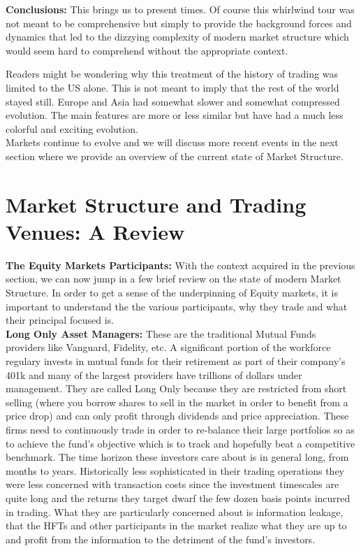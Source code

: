 \noindent\textbf{Conclusions:} This brings us to present times. Of course this whirlwind tour was not meant to be comprehensive but simply to provide the background forces and dynamics that led to the dizzying complexity of modern market structure which would seem hard to comprehend without the appropriate context. 

Readers might be wondering why this treatment of the history of trading was limited to the US alone. This is not meant to imply that the rest of the world stayed still. Europe and Asia had somewhat slower and somewhat compressed evolution. The main features are more or less similar but have had a much less colorful and exciting evolution. \\

Markets continue to evolve and we will discuss more recent events in the next section where we provide an overview of the current state of Market Structure.

\section{Market Structure and Trading Venues: A Review}


\noindent\textbf{The Equity Markets Participants:} With the context acquired in the previous section, we can now jump in a few brief review on the state of modern Market Structure. In order to get a sense of the underpinning of Equity markets, it is important to understand the the various participants, why they trade and what their principal focused is. \\


\noindent\textbf{Long Only Asset Managers:} These are the traditional Mutual Funds providers like Vanguard, Fidelity, etc. A significant portion of the workforce regulary invests in mutual funds for their retirement as part of their company's 401k and many of the largest providers have trillions of dollars under management. They are called Long Only because they are restricted from short selling (where you borrow shares to sell in the market in order to benefit from a price drop) and can only profit through dividends and price appreciation. These firms need to continuously trade in order to re-balance their large portfolios so as to achieve the fund's objective which is to track and hopefully beat a competitive benchmark. The time horizon these investors care about is in general long, from months to years. Historically less sophisticated in their trading operations they were less concerned with transaction costs since the investment timescales are quite long and the returns they target dwarf the few dozen basis points incurred in trading.  What they are particularly concerned about is information leakage, that the HFTs and other participants in the market realize what they are up to and profit from the information to the detriment of the fund's investors. \\


